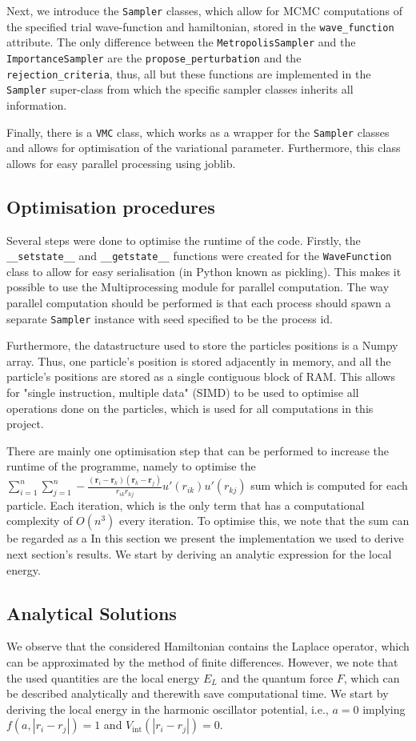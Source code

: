 \documentclass[11pt,a4paper]{article}
\numberwithin{equation}{section}
\begin{document}
Next, we introduce the \texttt{Sampler} classes, which allow for MCMC computations of the specified trial wave-function and hamiltonian, stored in the \texttt{wave\_function} attribute. The only difference between the \texttt{MetropolisSampler} and the \texttt{ImportanceSampler} are the \texttt{propose\_perturbation} and the \texttt{rejection\_criteria}, thus, all but these functions are implemented in the \texttt{Sampler} super-class from which the specific sampler classes inherits all information.

Finally, there is a \texttt{VMC} class, which works as a wrapper for the \texttt{Sampler} classes and allows for optimisation of the variational parameter. Furthermore, this class allows for easy parallel processing using joblib.

\subsection{Optimisation procedures}
Several steps were done to optimise the runtime of the code. Firstly, the \texttt{__setstate__} and \texttt{__getstate__} functions were created for the \texttt{WaveFunction} class to allow for easy serialisation (in Python known as pickling). This makes it possible to use the Multiprocessing module for parallel computation. The way parallel computation should be performed is that each process should spawn a separate \texttt{Sampler} instance with seed specified to be the process id.

Furthermore, the datastructure used to store the particles positions is a Numpy array. Thus, one particle's position is stored adjacently in memory, and all the particle's positions are stored as a single contiguous block of RAM. This allows for "single instruction, multiple data" (SIMD) to be used to optimise all operations done on the particles, which is used for all computations in this project.

There are mainly one optimisation step that can be performed to increase the runtime of the programme, namely to optimise the $\sum_{i=1}^n \sum_{j=1}^n -\frac{(\bm{r}_i - \bm{r}_k)(\bm{r}_k - \bm{r}_j)}{r_{ik}r_{kj}}u'(r_{ik})u'(r_{kj})$ sum which is computed for each particle. Each iteration, which is the only term that has a computational complexity of $O(n^3)$ every iteration. To optimise this, we note that the sum can be regarded as a 
In this section we present the implementation we used to derive next section's results. 
%
We start by deriving an analytic expression for the local energy. 
\subsection{Analytical Solutions}
%
%
We observe that the considered Hamiltonian contains the Laplace operator, which can be approximated by the method of finite differences.
%
However, we note that the used quantities are the local energy $E_L$ and the quantum force $F$, which can be described analytically and therewith save computational time. 
%
We start by deriving the local energy in the harmonic oscillator potential, i.e., $a=0$ implying $f(a,|r_i-r_j|)=1$ and $V_{\mathrm{int}}(|r_i-r_j|)=0$.
%
\end{document}
